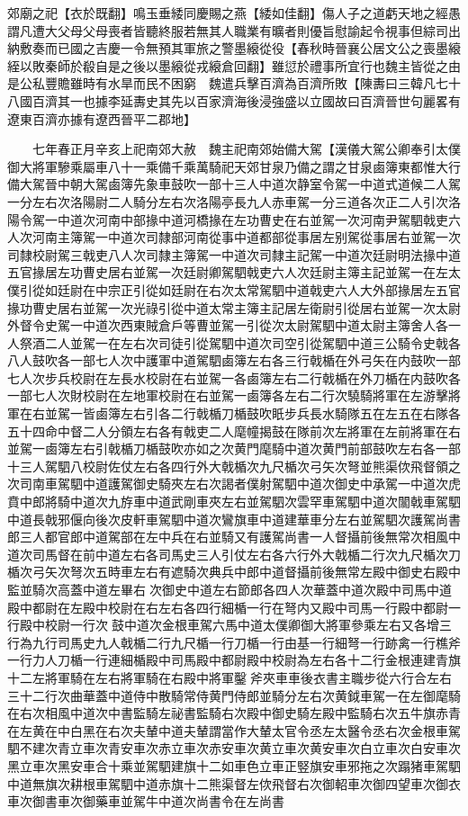 郊廟之祀【衣於既翻】鳴玉垂緌同慶賜之燕【緌如佳翻】傷人子之道虧天地之經愚謂凡遭大父母父母喪者皆聽終服若無其人職業有曠者則優旨慰諭起令視事但綜司出納敷奏而已國之吉慶一令無預其軍旅之警墨縗從役【春秋時晉襄公居文公之喪墨縗絰以敗秦師於殽自是之後以墨縗從戎縗倉回翻】雖愆於禮事所宜行也魏主皆從之由是公私豐贍雖時有水旱而民不困窮　魏遣兵擊百濟為百濟所敗【陳夀曰三韓凡七十八國百濟其一也據李延夀史其先以百家濟海後浸強盛以立國故曰百濟晉世句麗畧有遼東百濟亦據有遼西晉平二郡地】

　　七年春正月辛亥上祀南郊大赦　魏主祀南郊始備大駕【漢儀大駕公卿奉引太僕御大將軍驂乘屬車八十一乘備千乘萬騎祀天郊甘泉乃備之謂之甘泉鹵簿東都惟大行備大駕晉中朝大駕鹵簿先象車鼓吹一部十三人中道次静室令駕一中道式道候二人駕一分左右次洛陽尉二人騎分左右次洛陽亭長九人赤車駕一分三道各次正二人引次洛陽令駕一中道次河南中部掾中道河橋掾在左功曹史在右並駕一次河南尹駕駟戟吏六人次河南主簿駕一中道次司隸部河南從事中道都部從事居左别駕從事居右並駕一次司隸校尉駕三戟吏八人次司隸主簿駕一中道次司隸主記駕一中道次廷尉明法掾中道五官掾居左功曹史居右並駕一次廷尉卿駕駟戟吏六人次廷尉主簿主記並駕一在左太僕引從如廷尉在中宗正引從如廷尉在右次太常駕駟中道戟吏六人大外部掾居左五官掾功曹史居右並駕一次光祿引從中道太常主簿主記居左衛尉引從居右並駕一次太尉外督令史駕一中道次西東賊倉戶等曹並駕一引從次太尉駕駟中道太尉主簿舍人各一人祭酒二人並駕一在左右次司徒引從駕駟中道次司空引從駕駟中道三公騎令史戟各八人鼓吹各一部七人次中護軍中道駕駟鹵簿左右各三行戟楯在外弓矢在内鼓吹一部七人次步兵校尉在左長水校尉在右並駕一各鹵簿左右二行戟楯在外刀楯在内鼓吹各一部七人次財校尉在左地軍校尉在右並駕一鹵簿各左右二行次驍騎將軍在左游擊將軍在右並駕一皆鹵簿左右引各二行戟楯刀楯鼓吹眂步兵長水騎隊五在左五在右隊各五十四命中督二人分領左右各有戟吏二人麾幢揭鼓在隊前次左將軍在左前將軍在右並駕一鹵簿左右引戟楯刀楯鼓吹亦如之次黄門麾騎中道次黄門前部鼓吹左右各一部十三人駕駟八校尉佐仗左右各四行外大戟楯次九尺楯次弓矢次弩並熊渠佽飛督領之次司南車駕駟中道護駕御史騎夾左右次謁者僕射駕駟中道次御史中承駕一中道次虎賁中郎將騎中道次九斿車中道武剛車夾左右並駕駟次雲罕車駕駟中道次闟戟車駕駟中道長戟邪偃向後次皮軒車駕駟中道次鸞旗車中道建華車分左右並駕駟次護駕尚書郎三人都官郎中道駕部在左中兵在右並騎又有護駕尚書一人督攝前後無常次相風中道次司馬督在前中道左右各司馬史三人引仗左右各六行外大戟楯二行次九尺楯次刀楯次弓矢次弩次五時車左右有遮騎次典兵中郎中道督攝前後無常左殿中御史右殿中監並騎次高蓋中道左畢右次御史中道左右節郎各四人次華蓋中道次殿中司馬中道殿中都尉在左殿中校尉在右左右各四行細楯一行在弩内又殿中司馬一行殿中都尉一行殿中校尉一行次鼓中道次金根車駕六馬中道太僕卿御大將軍參乘左右又各增三行為九行司馬史九人戟楯二行九尺楯一行刀楯一行由基一行細弩一行跡禽一行樵斧一行力人刀楯一行連細楯殿中司馬殿中都尉殿中校尉為左右各十二行金根連建青旗十二左將軍騎在左右將軍騎在右殿中將軍鑿斧夾車車後衣書主職步從六行合左右三十二行次曲華蓋中道侍中散騎常侍黄門侍郎並騎分左右次黄鉞車駕一在左御麾騎在右次相風中道次中書監騎左祕書監騎右次殿中御史騎左殿中監騎右次五牛旗赤青在左黄在中白黑在右次夫輦中道夫輦謂當作大輦太官令丞左太醫令丞右次金根車駕駟不建次青立車次青安車次赤立車次赤安車次黄立車次黄安車次白立車次白安車次黑立車次黑安車合十乘並駕駟建旗十二如車色立車正竪旗安車邪拖之次蹋猪車駕駟中道無旗次耕根車駕駟中道赤旗十二熊渠督左佽飛督右次御軺車次御四望車次御衣車次御書車次御藥車並駕牛中道次尚書令在左尚書